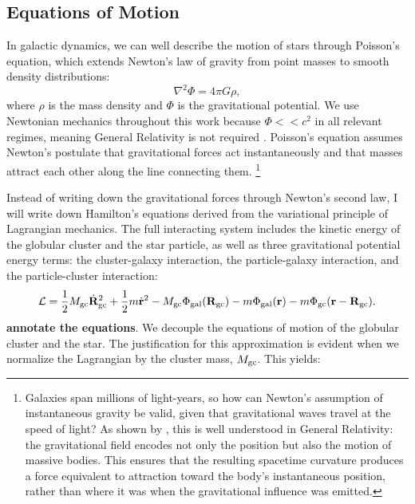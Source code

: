     
    \subsection{Equations of Motion} \label{subsec:myEquationsOfMotion}

        In galactic dynamics, we can well describe the motion of stars through Poisson's equation, which extends Newton's law of gravity from point masses to smooth density distributions: 
        \begin{equation} \label{eq:poissonsequation}
            \nabla^2 \Phi = 4\pi G \rho,
        \end{equation}
        where $\rho$ is the mass density and $\Phi$ is the gravitational potential. We use Newtonian mechanics throughout this work because $\Phi << c^2$ in all relevant regimes, meaning General Relativity is not required \citep[see Appendix C of][]{bovy_inprep}. Poisson's equation assumes Newton's postulate that gravitational forces act instantaneously and that masses attract each other along the line connecting them. \footnote{Galaxies span millions of light-years, so how can Newton's assumption of instantaneous gravity be valid, given that gravitational waves travel at the speed of light? As shown by \citet{2000PhLA..267...81C}, this is well understood in General Relativity: the gravitational field encodes not only the position but also the motion of massive bodies. This ensures that the resulting spacetime curvature produces a force equivalent to attraction toward the body's instantaneous position, rather than where it was when the gravitational influence was emitted.}

        Instead of writing down the gravitational forces through Newton's second law, I will write down Hamilton's equations derived from the variational principle of Lagrangian mechanics. The full interacting system includes the kinetic energy of the globular cluster and the star particle, as well as three gravitational potential energy terms: the cluster-galaxy interaction, the particle-galaxy interaction, and the particle-cluster interaction:
        \begin{equation}
            \mathcal{L} = \frac{1}{2} M_{\rm gc} \dot{\mathbf{R}}_{\rm gc}^2 
                        + \frac{1}{2} m \dot{\mathbf{r}}^2 
                        - M_{\rm gc} \Phi_{\rm gal}(\mathbf{R}_{\rm gc}) 
                        - m \Phi_{\rm gal}(\mathbf{r}) 
                        - m \Phi_{\rm gc}(\mathbf{r} - \mathbf{R}_{\rm gc}).
        \end{equation}  
        \textbf{annotate the equations}. We decouple the equations of motion of the globular cluster and the star. The justification for this approximation is evident when we normalize the Lagrangian by the cluster mass, \( M_{\rm gc} \). This yields:

